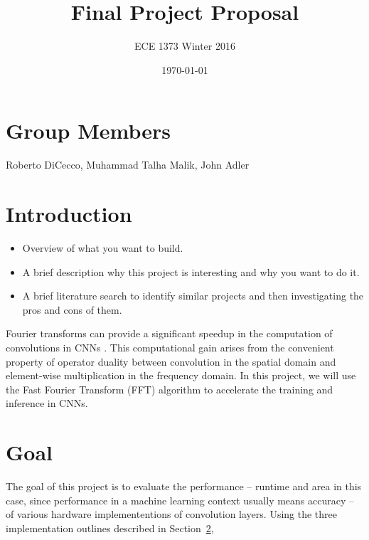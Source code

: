 \documentclass[conference,compsoc]{IEEEtran/IEEEtran}
\title{\bf Final Project Proposal}
\author{ECE 1373 Winter 2016}
\date{\today}
\begin{document}
\maketitle

\section{Group Members}
Roberto DiCecco, Muhammad Talha Malik, John Adler

\section{Introduction}\label{section:intro}
\begin{itemize}
\item Overview of what you want to build.
\item A brief description why this project is interesting and why you want to do it.
\item A brief literature search to identify similar projects and then investigating the pros and cons of them.
\end{itemize}


Fourier transforms can provide a significant speedup in the computation of convolutions in CNNs \cite{FFT1, FFT2}. This computational gain arises from the convenient property of operator duality between convolution in the spatial domain and element-wise multiplication in the frequency domain. In this project, we will use the Fast Fourier Transform (FFT) algorithm to accelerate the training and inference in CNNs.


\section{Goal}\label{section:goal}

The goal of this project is to evaluate the performance -- runtime and area in this case, since performance in a machine learning context usually means accuracy -- of various hardware implemententions of convolution layers.
Using the three implementation outlines described in Section~\ref{section:intro}, 
\end{document}
